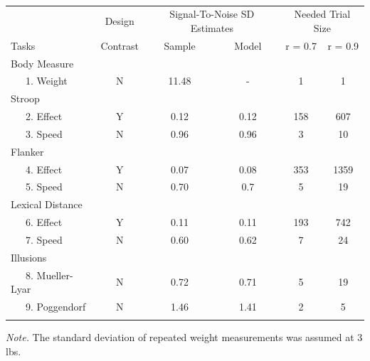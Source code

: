 \documentclass[
  ,man]{apa6}
\begin{document}
\begin{table}[tbp]

\begin{center}
\begin{threeparttable}

\caption{\label{tab:allTasks}}

\begin{tabular}{lccccc}
\toprule
 & \multicolumn{1}{c}{Design} & \multicolumn{2}{c}{Signal-To-Noise SD
                        Estimates} & \multicolumn{2}{c}{Needed Trial Size} \\
\cmidrule(r){2-2} \cmidrule(r){3-4} \cmidrule(r){5-6}
Tasks & \multicolumn{1}{c}{Contrast} & \multicolumn{1}{c}{Sample} & \multicolumn{1}{c}{Model} & \multicolumn{1}{c}{r = 0.7} & \multicolumn{1}{c}{r = 0.9}\\
\midrule
Body Measure &  &  &  &  & \\
\ \ \ 1. Weight & N & 11.48 & - & 1 & 1\\
Stroop &  &  &  &  & \\
\ \ \ 2. Effect & Y & 0.12 & 0.12 & 158 & 607\\
\ \ \ 3. Speed & N & 0.96 & 0.96 & 3 & 10\\
Flanker &  &  &  &  & \\
\ \ \ 4. Effect & Y & 0.07 & 0.08 & 353 & 1359\\
\ \ \ 5. Speed & N & 0.70 & 0.7 & 5 & 19\\
Lexical Distance &  &  &  &  & \\
\ \ \ 6. Effect & Y & 0.11 & 0.11 & 193 & 742\\
\ \ \ 7. Speed & N & 0.60 & 0.62 & 7 & 24\\
Illusions &  &  &  &  & \\
\ \ \ 8. Mueller-Lyar & N & 0.72 & 0.71 & 5 & 19\\
\ \ \ 9. Poggendorf & N & 1.46 & 1.41 & 2 & 5\\
\bottomrule
\addlinespace
\end{tabular}

\begin{tablenotes}[para]
\normalsize{\textit{Note.} The standard deviation of repeated weight measurements was assumed at 3 lbs.}
\end{tablenotes}

\end{threeparttable}
\end{center}

\end{table}
\end{document}
